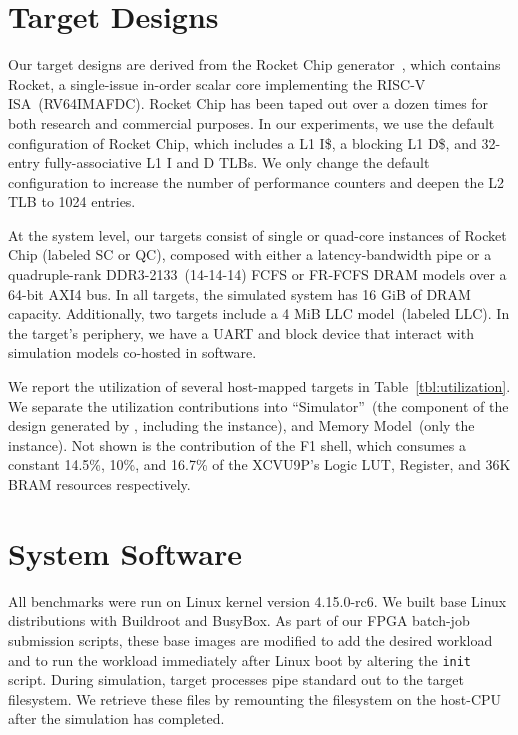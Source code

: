 \section{Target Designs}\label{sec:target-parameters} Our target designs
are derived from the Rocket Chip generator~\cite{rocketchip}, which contains
Rocket, a single-issue in-order scalar core implementing the RISC-V
ISA~(RV64IMAFDC). Rocket Chip
has been taped out over a dozen times for both research and commercial
purposes. In our
experiments, we use the default
configuration of Rocket Chip, which includes
a  L1 I\$, a blocking  L1 D\$, and 32-entry
fully-associative L1 I and D TLBs. We only change the default configuration to
increase the number of performance counters and deepen the L2 TLB to 1024 entries.

At the system level, our targets consist of single or quad-core instances
of Rocket Chip (labeled SC or QC), composed with either a latency-bandwidth pipe
or a quadruple-rank DDR3-2133~(14-14-14) FCFS or FR-FCFS
DRAM models over a 64-bit AXI4 bus. In all targets, the simulated system has
16 GiB of DRAM capacity. Additionally, two targets include a 4 MiB
LLC model~(labeled LLC). In the target's periphery, we have a UART and block
device that interact with simulation models co-hosted in software.

We report the utilization of several host-mapped targets in
Table~\ref{tbl:utilization}.  We separate the utilization contributions into ``Simulator''~(the
component of the design generated by \SIMNAME, including the \PNAME instance),
and Memory Model~(only the \PNAME instance). Not shown is the contribution of the
F1 shell, which consumes a constant 14.5\%, 10\%, and 16.7\%  of the XCVU9P's
Logic LUT, Register, and 36K BRAM resources respectively.

\vspace{-0.05in}
\section{System Software}

All benchmarks were run on Linux kernel version 4.15.0-rc6. We built base Linux
distributions with Buildroot and BusyBox. As part of our FPGA batch-job submission
scripts, these base images are modified to add the desired workload and to run
the workload immediately after Linux boot by altering the \texttt{init}
script. During simulation, target processes pipe standard out to the target
filesystem. We retrieve these files by remounting the filesystem on the
host-CPU after the simulation has completed.

